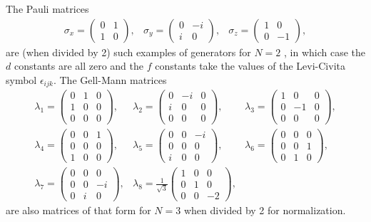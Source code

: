 The Pauli matrices
\[ \begin{array} {ccc}  
\sigma_x= \left( \begin{array} {cc} 0 &1 \\ 1 & 0\end{array} \right), & \sigma_y= \left( \begin{array} {cc} 0 &-i \\ i & 0\end{array} \right) ,&\sigma_z=  \left( \begin{array} {cc} 1 &0 \\ 0 & -1 \end{array} \right),  \end{array} \]
are (when divided by 2) such examples of generators for $N=2$ , in which case the $d$ constants are all zero and the $f$ constants take the values of the Levi-Civita symbol $\epsilon_{ijk}$. The Gell-Mann matrices
\[ \begin{array} {ccc} 
\lambda_1 = \left(\begin{array} {ccc}0 & 1 & 0 \\ 1 & 0 & 0 \\ 0 & 0 & 0 \end{array}\right), &
\lambda_2 =\left( \begin{array} {ccc}0 & -i & 0 \\ i & 0 & 0 \\ 0 & 0 & 0 \end{array}\right), &
\lambda_3 = \left(\begin{array} {ccc}1 & 0 & 0 \\ 0 & -1 & 0 \\ 0 & 0 & 0 \end{array}\right), \\ 
\lambda_4 = \left(\begin{array} {ccc}0 & 0 & 1 \\ 0 & 0 & 0 \\ 1 & 0 & 0 \end{array}\right) ,&
\lambda_5 = \left(\begin{array} {ccc}0 & 0 & -i \\ 0 & 0 & 0 \\ i & 0 & 0 \end{array}\right) ,&
\lambda_6 = \left(\begin{array} {ccc}0 & 0 & 0 \\ 0 & 0 & 1 \\ 0 & 1 & 0 \end{array}\right) ,\\
\lambda_7 = \left(\begin{array} {ccc}0 & 0 & 0 \\ 0 & 0 & -i \\ 0 & i & 0 \end{array}\right) , & 
\lambda_8 = \frac{1}{\sqrt{3}} \left(\begin{array} {ccc}1 & 0 & 0 \\ 0 & 1 & 0 \\ 0 & 0 & -2 \end{array}\right), &
\end{array} \]
 are also matrices of that form for $N=3$ when divided by 2 for normalization. 
 
